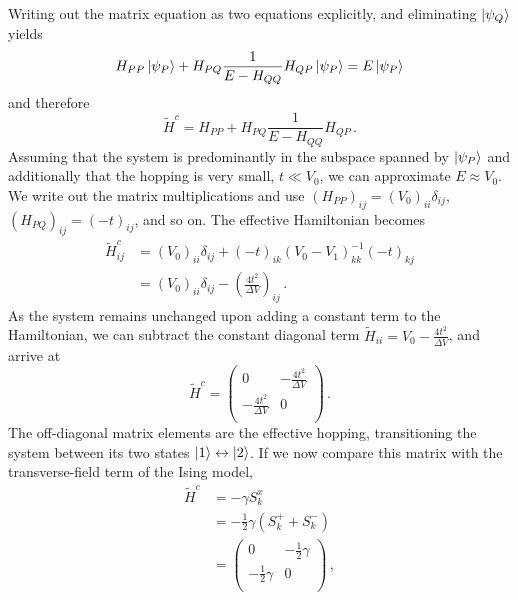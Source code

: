 %
Writing out the matrix equation as two equations explicitly, and eliminating
$\left|\psi_Q\right>$ yields 
%
\begin{equation}
  H_{PP} \left|\psi_P\right> + H_{PQ} \frac{1}{E - H_{QQ}} H_{QP} \left|\psi_P\right>
  =
  E \left|\psi_P\right>
\end{equation}
%
and therefore
%
\begin{equation}
  \label{eq:H_effective}
  \tilde{H}^c = H_{PP} + H_{PQ} \frac{1}{E - H_{QQ}} H_{QP} \, .
\end{equation}
%
Assuming that the system is predominantly in the subspace spanned by
$\left|\psi_P\right>$ and additionally that the hopping is very small, $t \ll V_0$, we
can approximate $E \approx V_0$. We write out the matrix multiplications and use
$\left( H_{PP} \right)_{ij} = \left( V_0 \right)_{ii} \delta_{ij}$, $\left(
H_{PQ} \right)_{ij} = \left( -t \right)_{ij}$, and so on. The effective
Hamiltonian becomes
%
\begin{equation}
\begin{split}
  \tilde{H}^c_{ij}
  &=
  \left( V_0 \right)_{ii} \delta_{ij}
  + \left( - t \right)_{ik}
    \left( V_0 - V_1 \right)^{-1}_{kk}
    \left( - t \right)_{kj} \\
  &=
  \left( V_0 \right)_{ii} \delta_{ij}
  - \left( \frac{4 t^2}{\Delta V} \right)_{ij} \, .
\end{split}
\end{equation}
%
As the system remains unchanged upon adding a constant term to the Hamiltonian,
we can subtract the constant diagonal term $\tilde{H}_{ii} = V_0 - \frac{4
t^2}{\Delta V}$, and arrive at
%
\begin{equation}
  \tilde{H}^c
  =
  \begin{pmatrix}
    0 & - \frac{4 t^2}{\Delta V} \\
    - \frac{4 t^2}{\Delta V} & 0 \\
  \end{pmatrix} \, .
\end{equation}
%
The off-diagonal matrix elements are the effective hopping, transitioning the
system between its two states $\left|1\right> \leftrightarrow \left|2\right>$. If we now
compare this matrix with the transverse-field term of the Ising model,
%
\begin{equation}
\begin{split}
  \tilde{H}^c
  &=
  - \gamma S^x_k \\
  &=
  - \frac{1}{2} \gamma \left( S^+_k + S^-_k \right) \\[0.5em]
  &= 
  \begin{pmatrix}
    0 & - \frac{1}{2} \gamma \\
    - \frac{1}{2} \gamma & 0 \\
  \end{pmatrix} \, ,
\end{split}
\end{equation}
